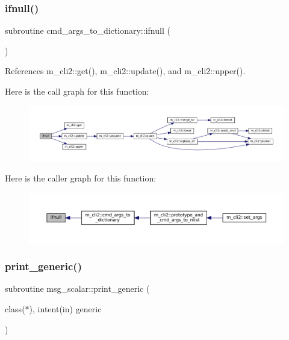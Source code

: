 \subsubsection{\texorpdfstring{ifnull()}{ifnull()}}
{\footnotesize\ttfamily subroutine cmd\+\_\+args\+\_\+to\+\_\+dictionary\+::ifnull (\begin{DoxyParamCaption}{ }\end{DoxyParamCaption})\hspace{0.3cm}{\ttfamily [private]}}



References m\+\_\+cli2\+::get(), m\+\_\+cli2\+::update(), and m\+\_\+cli2\+::upper().

Here is the call graph for this function\+:\nopagebreak
\begin{figure}[H]
\begin{center}
\leavevmode
\includegraphics[width=350pt]{M__CLI2_8f90_aa26f90016621d1ee43d3b5b66316532b_cgraph}
\end{center}
\end{figure}
Here is the caller graph for this function\+:
\nopagebreak
\begin{figure}[H]
\begin{center}
\leavevmode
\includegraphics[width=350pt]{M__CLI2_8f90_aa26f90016621d1ee43d3b5b66316532b_icgraph}
\end{center}
\end{figure}
\mbox{\label{M__CLI2_8f90_aaa8ee15f943d8e1543ae35ab732c3cd2}} 
\subsubsection{\texorpdfstring{print\+\_\+generic()}{print\_generic()}\hspace{0.1cm}{\footnotesize\ttfamily [1/2]}}
{\footnotesize\ttfamily subroutine msg\+\_\+scalar\+::print\+\_\+generic (\begin{DoxyParamCaption}\item[{class($\ast$), intent(in)}]{generic }\end{DoxyParamCaption})\hspace{0.3cm}{\ttfamily [private]}}

